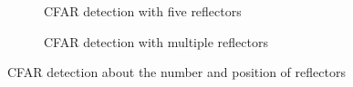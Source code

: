 \documentclass[12pt,DIV14,BCOR12mm,a4paper,footinclude=false,headinclude,parskip=half-,twoside,openright,cleardoublepage=empty,toc=index,bibliography=totoc,listof=totoc]{scrreprt}
\numberwithin{equation}{chapter}
\begin{document}
\begin{figure}[t]
    \centering
    \begin{subfigure}{0.45\textwidth}
        \centering
        \caption{CFAR detection with five reflectors}
    \end{subfigure}\hspace{0.5cm}
    \begin{subfigure}{0.45\textwidth}
        \centering
        \caption{CFAR detection with multiple reflectors}
    \end{subfigure}
    \caption{CFAR detection about the number and position of reflectors}
    \label{cfar detection about the number and position of reflectors}
\end{figure}
\end{document}
